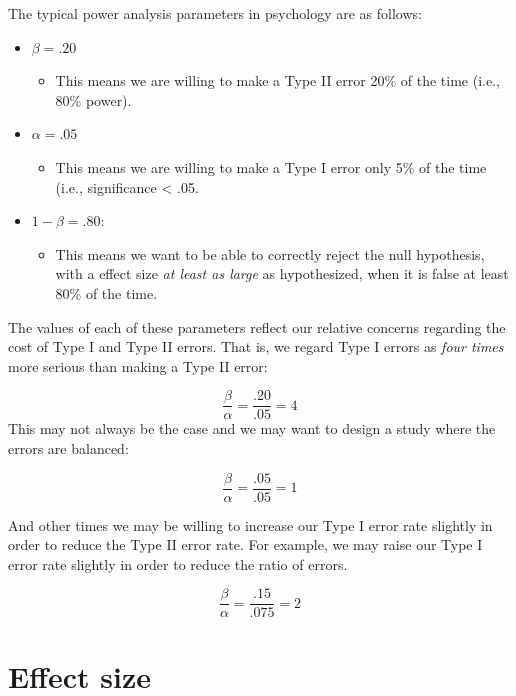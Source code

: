 \documentclass[
]{book}
\providecommand{\tightlist}{%
  \setlength{\itemsep}{0pt}\setlength{\parskip}{0pt}}
\begin{document}
The typical power analysis parameters in psychology are as follows:

\begin{itemize}
\item
  \(\beta = .20\)

  \begin{itemize}
  \tightlist
  \item
    This means we are willing to make a Type II error 20\% of the time (i.e., 80\% power).
  \end{itemize}
\item
  \(\alpha = .05\)

  \begin{itemize}
  \tightlist
  \item
    This means we are willing to make a Type I error only 5\% of the time (i.e., significance \textless{} .05.
  \end{itemize}
\item
  \(1-\beta = .80\):

  \begin{itemize}
  \tightlist
  \item
    This means we want to be able to correctly reject the null hypothesis, with a effect size \emph{at least as large} as hypothesized, when it is false at least 80\% of the time.
  \end{itemize}
\end{itemize}

The values of each of these parameters reflect our relative concerns regarding the cost of Type I and Type II errors. That is, we regard Type I errors as \emph{four times} more serious than making a Type II error:

\[\frac{\beta}{\alpha} = \frac{.20}{.05} = 4\]
This may not always be the case and we may want to design a study where the errors are balanced:

\[\frac{\beta}{\alpha} = \frac{.05}{.05} = 1\]

And other times we may be willing to increase our Type I error rate slightly in order to reduce the Type II error rate. For example, we may raise our Type I error rate slightly in order to reduce the ratio of errors.

\[\frac{\beta}{\alpha} = \frac{.15}{.075} = 2\]

\hypertarget{effect-size}{%
\section{Effect size}\label{effect-size}}
\end{document}
